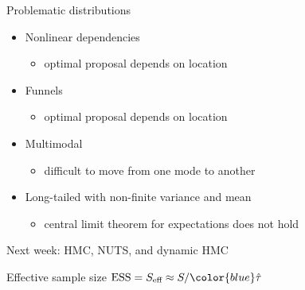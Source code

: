 \documentclass[finnish,english,t]{beamer}
\def\eff{\text{eff}}
\def\ESS{\text{ESS}}
\begin{document}
\begin{frame}{Problematic distributions}

  \begin{itemize}
  \item<1-> Nonlinear dependencies
    \begin{itemize}
    \item optimal proposal depends on location
    \end{itemize}
  \item<2-> Funnels
    \begin{itemize}
    \item optimal proposal depends on location
    \end{itemize}
  \item<3-> Multimodal
    \begin{itemize}
    \item difficult to move from one mode to another
    \end{itemize}
  \item<4-> Long-tailed with non-finite variance and mean
    \begin{itemize}
    \item central limit theorem for expectations does not hold
    \end{itemize}
  \end{itemize}

\end{frame}

\begin{frame}
  
   {\Large\color{navyblue} Next week: HMC, NUTS, and dynamic HMC}

   Effective sample size $\ESS = S_\eff \approx S/{\color{blue}\hat{\tau}}$\\
   
\end{frame}
\end{document}
